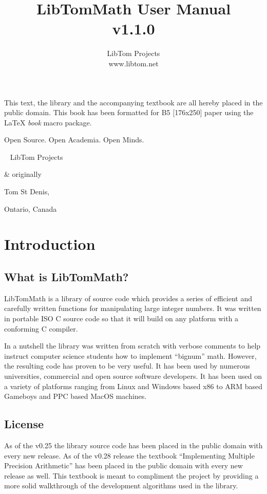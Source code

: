 \documentclass[synpaper]{book}
\begin{document}
\frontmatter
\pagestyle{empty}
\title{LibTomMath User Manual \\ v1.1.0}
\author{LibTom Projects \\ www.libtom.net}
\maketitle
This text, the library and the accompanying textbook are all hereby placed in the public domain.  This book has been
formatted for B5 [176x250] paper using the \LaTeX{} {\em book} macro package.

\vspace{10cm}

\begin{flushright}Open Source.  Open Academia.  Open Minds.

\mbox{ }
LibTom Projects

\& originally

Tom St Denis,

Ontario, Canada
\end{flushright}

\tableofcontents
\listoffigures
\mainmatter
\pagestyle{headings}
\chapter{Introduction}
\section{What is LibTomMath?}
LibTomMath is a library of source code which provides a series of efficient and carefully written functions for manipulating
large integer numbers.  It was written in portable ISO C source code so that it will build on any platform with a conforming
C compiler.

In a nutshell the library was written from scratch with verbose comments to help instruct computer science students how
to implement ``bignum'' math.  However, the resulting code has proven to be very useful.  It has been used by numerous
universities, commercial and open source software developers.  It has been used on a variety of platforms ranging from
Linux and Windows based x86 to ARM based Gameboys and PPC based MacOS machines.

\section{License}
As of the v0.25 the library source code has been placed in the public domain with every new release.  As of the v0.28
release the textbook ``Implementing Multiple Precision Arithmetic'' has been placed in the public domain with every new
release as well.  This textbook is meant to compliment the project by providing a more solid walkthrough of the development
algorithms used in the library.
\end{document}

